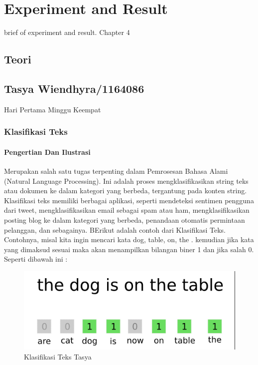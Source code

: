 \chapter{Experiment and Result}
brief of experiment and result. Chapter 4

\section{Teori}
\section{Tasya Wiendhyra/1164086}
Hari Pertama Minggu Keempat
\subsection{Klasifikasi Teks}
\subsubsection{Pengertian Dan Ilustrasi}
Merupakan salah satu tugas terpenting dalam Pemrosesan Bahasa Alami (Natural Language Processing). Ini adalah proses mengklasifikasikan string teks atau dokumen ke dalam kategori yang berbeda, tergantung pada konten string. Klasifikasi teks memiliki berbagai aplikasi, seperti mendeteksi sentimen pengguna dari tweet, mengklasifikasikan email sebagai spam atau ham, mengklasifikasikan posting blog ke dalam kategori yang berbeda, penandaan otomatis permintaan pelanggan, dan sebagainya. BErikut adalah contoh dari Klasifikasi Teks.\\
Contohnya, misal kita ingin mencari kata dog, table, on, the . kemudian jika kata yang dimaksud sesuai maka akan menampilkan bilangan biner 1 dan jika salah 0. Seperti dibawah ini :
\begin{figure}[ht]
\centering
\includegraphics[scale=0.5]{figures/chapter4tasya1.png}
\caption{Klasifikasi Teks Tasya}
\label{Contoh}
\end{figure}
\\
\\
\\
\\
